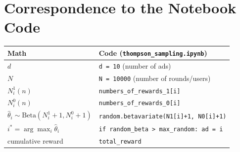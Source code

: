 \documentclass[11pt]{article}
\begin{document}
\section{Correspondence to the Notebook Code}

\begin{center}
\begin{tabular}{|l|l|}
\hline
\textbf{Math} & \textbf{Code (\texttt{thompson\_sampling.ipynb})} \\
\hline
$d$ & \texttt{d = 10} (number of ads) \\
$N$ & \texttt{N = 10000} (number of rounds/users) \\
$N_i^1(n)$ & \texttt{numbers\_of\_rewards\_1[i]} \\
$N_i^0(n)$ & \texttt{numbers\_of\_rewards\_0[i]} \\
$\hat\theta_i \sim \text{Beta}(N_i^1+1, N_i^0+1)$ & \texttt{random.betavariate(N1[i]+1, N0[i]+1)} \\
$i^\ast = \arg\max_i \hat\theta_i$ & \texttt{if random\_beta > max\_random: ad = i} \\
cumulative reward & \texttt{total\_reward} \\
\hline
\end{tabular}
\end{center}
\end{document}
